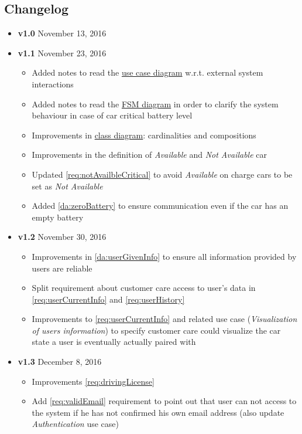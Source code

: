 \begin{appendices}
	\section{Changelog}
	\begin{itemize}
		\item \textbf{v1.0} November 13, 2016
		\item \textbf{v1.1} November 23, 2016
		\begin{itemize}
			\item Added notes to read the \hyperref[fig:usecase]{use case diagram} w.r.t. external system interactions
			\item Added notes to read the \hyperref[fig:carFSA]{FSM diagram} in order to clarify the system behaviour in case of car critical battery level
			\item Improvements in \hyperref[fig:classDiagram]{class diagram}: cardinalities and compositions
			\item Improvements in the definition of \emph{Available} and \emph{Not Available} car
			\item Updated \ref{req:notAvailbleCritical} to avoid \emph{Available} on charge cars to be set as \emph{Not Available}
			\item Added \ref{da:zeroBattery} to ensure communication even if the car has an empty battery
		\end{itemize}
		\item \textbf{v1.2} November 30, 2016
		\begin{itemize}
			\item Improvements in \ref{da:userGivenInfo} to ensure all information provided by users are reliable
			\item Split requirement about customer care access to user's data in
			\ref{req:userCurrentInfo} and \ref{req:userHistory}
			\item Improvements to \ref{req:userCurrentInfo} and related use case (\emph{Visualization of users information}) to specify
			customer care could visualize the car state a user is eventually actually paired with 
		\end{itemize}
		\item \textbf{v1.3} December 8, 2016
		\begin{itemize}
			\item Improvements \ref{req:drivingLicense}
			\item Add \ref{req:validEmail} requirement to point out that user can not access to the system if he has not confirmed his own email address (also update \emph{Authentication} use case)

\end{itemize}
\end{itemize}
\end{appendices}
